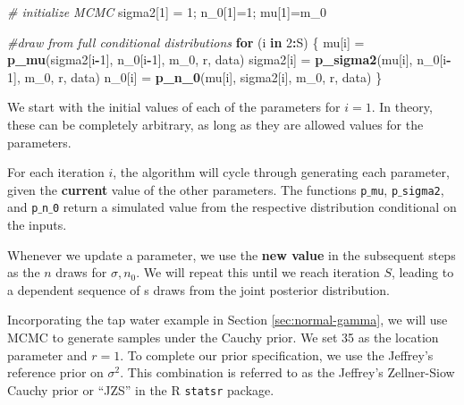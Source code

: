 \documentclass[]{book}
\newenvironment{Shaded}{\begin{snugshade}}{\end{snugshade}}
\newcommand{\KeywordTok}[1]{\textcolor[rgb]{0.13,0.29,0.53}{\textbf{#1}}}
\newcommand{\DecValTok}[1]{\textcolor[rgb]{0.00,0.00,0.81}{#1}}
\newcommand{\StringTok}[1]{\textcolor[rgb]{0.31,0.60,0.02}{#1}}
\newcommand{\CommentTok}[1]{\textcolor[rgb]{0.56,0.35,0.01}{\textit{#1}}}
\newcommand{\ControlFlowTok}[1]{\textcolor[rgb]{0.13,0.29,0.53}{\textbf{#1}}}
\newcommand{\OperatorTok}[1]{\textcolor[rgb]{0.81,0.36,0.00}{\textbf{#1}}}
\newcommand{\NormalTok}[1]{#1}
\theoremstyle{definition}
\theoremstyle{definition}
\theoremstyle{definition}
\theoremstyle{remark}
\begin{document}
\begin{Shaded}
\begin{Highlighting}[]
\CommentTok{# initialize MCMC}
\NormalTok{sigma2[}\DecValTok{1}\NormalTok{] =}\StringTok{ }\DecValTok{1}\NormalTok{; n_}\DecValTok{0}\NormalTok{[}\DecValTok{1}\NormalTok{]=}\DecValTok{1}\NormalTok{; mu[}\DecValTok{1}\NormalTok{]=m_}\DecValTok{0}

\CommentTok{#draw from full conditional distributions}
\ControlFlowTok{for}\NormalTok{ (i }\ControlFlowTok{in} \DecValTok{2}\OperatorTok{:}\NormalTok{S) \{}
\NormalTok{  mu[i]     =}\StringTok{ }\KeywordTok{p_mu}\NormalTok{(sigma2[i}\OperatorTok{-}\DecValTok{1}\NormalTok{], n_}\DecValTok{0}\NormalTok{[i}\OperatorTok{-}\DecValTok{1}\NormalTok{],  m_}\DecValTok{0}\NormalTok{, r, data)}
\NormalTok{  sigma2[i] =}\StringTok{ }\KeywordTok{p_sigma2}\NormalTok{(mu[i], n_}\DecValTok{0}\NormalTok{[i}\OperatorTok{-}\DecValTok{1}\NormalTok{],    m_}\DecValTok{0}\NormalTok{, r, data)}
\NormalTok{  n_}\DecValTok{0}\NormalTok{[i]    =}\StringTok{ }\KeywordTok{p_n_0}\NormalTok{(mu[i], sigma2[i],      m_}\DecValTok{0}\NormalTok{, r, data)}
\NormalTok{\}}
\end{Highlighting}
\end{Shaded}

We start with the initial values of each of the parameters for \(i=1\).
In theory, these can be completely arbitrary, as long as they are
allowed values for the parameters.

For each iteration \(i\), the algorithm will cycle through generating
each parameter, given the \textbf{current} value of the other
parameters. The functions \texttt{p$\_$mu}, \texttt{p$\_$sigma2}, and
\texttt{p$\_$n$\_$0} return a simulated value from the respective
distribution conditional on the inputs.

Whenever we update a parameter, we use the \textbf{new value} in the
subsequent steps as the \(n\) draws for \(\sigma, n_0\). We will repeat
this until we reach iteration \(S\), leading to a dependent sequence of
s draws from the joint posterior distribution.

Incorporating the tap water example in Section \ref{sec:normal-gamma},
we will use MCMC to generate samples under the Cauchy prior. We set 35
as the location parameter and \(r=1\). To complete our prior
specification, we use the Jeffrey's reference prior on \(\sigma^2\).
This combination is referred to as the Jeffrey's Zellner-Siow Cauchy
prior or ``JZS'' in the R \texttt{statsr} package.
\end{document}
